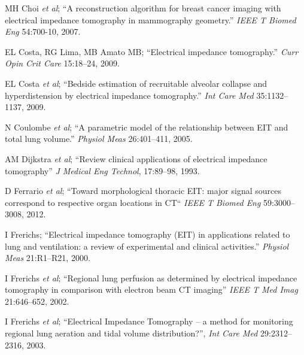 \documentclass[12pt]{article} \usepackage[margin=3cm]{geometry} \usepackage[margin=20pt,font=small,labelfont=bf]{caption}\def\TBLWIDA{35mm}\def\TBLWIDB{95mm}
\newcommand{\ifmaxthree}[2]{#2 {\em et al}; }
\begin{document}
\begin{thebibliography}{00}
\ifmaxthree{
MH Choi, TJ Kao, D Isaacson, GJ Saulnier, JC Newell
}{
MH Choi
}
``A reconstruction algorithm for breast cancer imaging with electrical impedance tomography in mammography geometry.''
{\em IEEE T Biomed Eng} 54:700-10, 2007. %

EL Costa, RG Lima, MB Amato MB;
``Electrical impedance tomography.''
{\em Curr Opin Crit Care} 15:18--24, 2009.

\ifmaxthree{
EL Costa, JB Borges, A Melo, F Suarez-Sipmann, C Toufen Jr., SH Böhm, MB Amato
}{
EL Costa
}
``Bedside estimation of recruitable alveolar collapse and hyperdistension by electrical
impedance tomography.''
{\em Int Care Med} 35:1132--1137, 2009.

\ifmaxthree{
N Coulombe, H Gagnon, F Marquis, Y Skrobik, R Guardo
}{
N Coulombe
}
``A parametric model of the relationship between EIT and total lung volume.''
{\em  Physiol Meas} 26:401--411, 2005.


\ifmaxthree{
AM Dijkstra, BH Brown, AD Leathard, ND Harris, DC Barber, DL Edbrooke,
}{
AM Dijkstra
}
``Review clinical applications of electrical impedance tomography''
{\em J Medical Eng Technol}, 17:89--98, 1993.

\ifmaxthree{
D Ferrario, B Grychtol, A Adler, J Sola, SH Böhm, M Bodenstein
}{
D Ferrario
}
``Toward morphological thoracic EIT: major signal sources correspond to respective organ locations in CT``
{\em  IEEE T Biomed Eng} 59:3000--3008, 2012.

I Frerichs;
``Electrical impedance tomography (EIT) in applications related to lung and ventilation: a review of experimental and clinical activities.''
{\em  Physiol Meas} 21:R1--R21, 2000.

\ifmaxthree{
I Frerichs, J Hinz, P Herrmann, G Weisser, G Hahn, M Quintel, G Hellige.
}{
I Frerichs
}
``Regional lung  perfusion  as  determined  by  electrical
  impedance  tomography  in  comparison  with  electron beam CT imaging''
{\em IEEE T Med Imag} 21:646--652, 2002.

\ifmaxthree{
I Frerichs, PA Dargavillle, T Dudykevych, PM Rimensberger,
}{
I Frerichs
}
``Electrical Impedance Tomography -- a method for monitoring
   regional lung aeration and tidal volume distribution?'',
{\em Int Care Med} 29:2312--2316, 2003.




\end{thebibliography}
\end{document}
